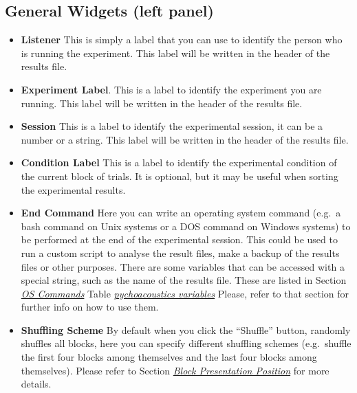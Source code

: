 \documentclass[a4paper,12pt,english]{sphinxmanual}
\begin{document}
\subsection{General Widgets (left panel)}
\label{graphical_user_interface:general-widgets-left-panel}\label{graphical_user_interface:sec-gui-left-panel}\begin{itemize}
\item {} 
\textbf{Listener} This is simply a label that you can use to identify the
person who is running the experiment. This label will be written in
the header of the results file.

\item {} 
\textbf{Experiment Label}. This is a label to identify the experiment you
are running. This label will be written in the header of the results
file.

\item {} 
\textbf{Session} This is a label to identify the experimental session, it
can be a number or a string. This label will be written in the header
of the results file.

\item {} 
\textbf{Condition Label} This is a label to identify the experimental
condition of the current block of trials. It is optional, but it may
be useful when sorting the experimental results.

\item {} 
\textbf{End Command} Here you can write an operating system command
(e.g. a bash command on Unix systems or a DOS command on Windows
systems) to be performed at the end of the experimental session. This
could be used to run a custom script to analyse the result files,
make a backup of the results files or other purposes. There are some
variables that can be accessed with a special string, such as the
name of the results file. These are listed in
Section {\hyperref[engine:sec-os-commands]{\emph{OS Commands}}} Table {\hyperref[engine:tab-pycho-variables]{\emph{pychoacoustics variables}}}
Please, refer to that section for further info on how to use them.

\item {} 
\textbf{Shuffling Scheme} By default when you click the “Shuffle” button,
 randomly shuffles all blocks, here you can specify
different shuffling schemes (e.g. shuffle the first four blocks among
themselves and the last four blocks among themselves). Please refer
to Section {\hyperref[engine:sec-shuffling]{\emph{Block Presentation Position}}} for more details.


\end{itemize}
\end{document}
